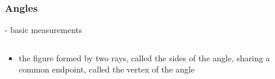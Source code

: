 \begin{module}[id=angle]
\begin{frame}
  \frametitle{Angles}
  - basic measurements\\
  \begin{columns}
    \begin{column}{5.8cm}
      \begin{itemize}
      \item
      \begin{definition}
         the figure formed by two rays, called the sides of the angle, sharing a common endpoint, called the vertex of the angle
      \end{definition}
    \end{itemize}
    \end{column}
    \begin{column}{5.5cm}
    \end{column}
  \end{columns}
\end{frame}
\end{module}
